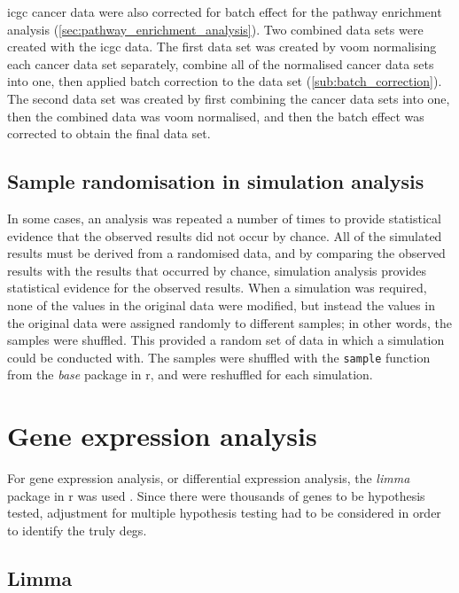 \gls{icgc} cancer data were also corrected for batch effect for the pathway enrichment analysis (\cref{sec:pathway_enrichment_analysis}).
Two combined data sets were created with the \gls{icgc} data.
The first data set was created by voom normalising each cancer data set separately, combine all of the normalised cancer data sets into one, then applied batch correction to the data set (\cref{sub:batch_correction}).
The second data set was created by first combining the cancer data sets into one, then the combined data was voom normalised, and then the batch effect was corrected to obtain the final data set.

\subsection{Sample randomisation in simulation analysis}
\label{sub:sample_randomisation_in_simulation_analysis}

In some cases, an analysis was repeated a number of times to provide statistical evidence that the observed results did not occur by chance.
All of the simulated results must be derived from a randomised data, and by comparing the observed results with the results that occurred by chance, simulation analysis provides statistical evidence for the observed results.
When a simulation was required, none of the values in the original data were modified, but instead the values in the original data were assigned randomly to different samples; in other words, the samples were shuffled.
This provided a random set of data in which a simulation could be conducted with.
The samples were shuffled with the \texttt{sample} function from the \textit{base} package in \gls{r}, and were reshuffled for each simulation.

\section{Gene expression analysis}
\label{sec:gene_expression_analysis}

For gene expression analysis, or differential expression analysis, the \textit{limma} package in \gls{r} was used \citep{Ritchie2015}.
Since there were thousands of genes to be hypothesis tested, adjustment for multiple hypothesis testing had to be considered in order to identify the truly \glspl{deg}.

\subsection{Limma}
\label{sub:limma}

